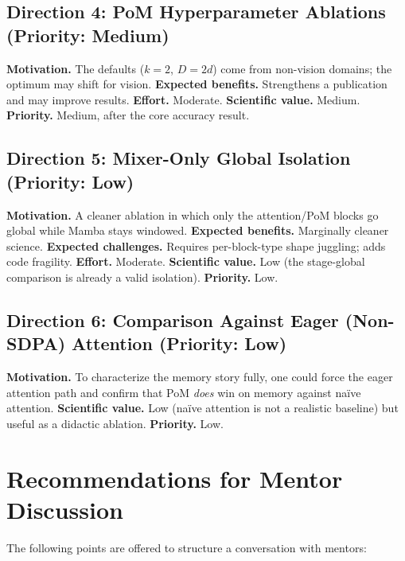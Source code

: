 \documentclass[11pt,a4paper]{article}
\begin{document}
\subsection*{Direction 4: PoM Hyperparameter Ablations (Priority: Medium)}
\textbf{Motivation.} The defaults ($k=2$, $D=2d$) come from non-vision domains; the optimum may shift for vision. \textbf{Expected benefits.} Strengthens a publication and may improve results. \textbf{Effort.} Moderate. \textbf{Scientific value.} Medium. \textbf{Priority.} Medium, after the core accuracy result.

\subsection*{Direction 5: Mixer-Only Global Isolation (Priority: Low)}
\textbf{Motivation.} A cleaner ablation in which only the attention/PoM blocks go global while Mamba stays windowed. \textbf{Expected benefits.} Marginally cleaner science. \textbf{Expected challenges.} Requires per-block-type shape juggling; adds code fragility. \textbf{Effort.} Moderate. \textbf{Scientific value.} Low (the stage-global comparison is already a valid isolation). \textbf{Priority.} Low.

\subsection*{Direction 6: Comparison Against Eager (Non-SDPA) Attention (Priority: Low)}
\textbf{Motivation.} To characterize the memory story fully, one could force the eager attention path and confirm that PoM \emph{does} win on memory against na\"ive attention. \textbf{Scientific value.} Low (na\"ive attention is not a realistic baseline) but useful as a didactic ablation. \textbf{Priority.} Low.

\section{Recommendations for Mentor Discussion}

The following points are offered to structure a conversation with mentors:
\end{document}
